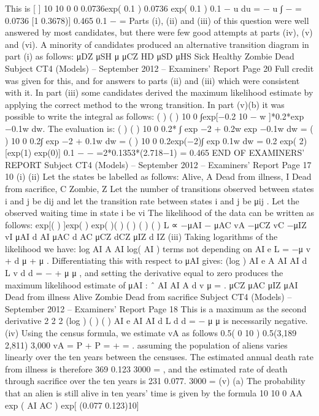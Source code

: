 \documentclass[a4paper,12pt]{article}
\begin{document}
This is
[ ]
10
10
0
0
0.0736exp( 0.1 ) 0.0736 exp( 0.1 )
0.1
− u du = − u
∫ −
= 0.0736 [1 0.3678)] 0.465
0.1
− =
Parts (i), (ii) and (iii) of this question were well answered by most candidates, but there were
few good attempts at parts (iv), (v) and (vi). A minority of candidates produced an
alternative transition diagram in part (i) as follows:
μDZ
μSH
μ μCZ HD μSD
μHS
Sick
Healthy
Zombie
Dead
Subject CT4 (Models) – September 2012 – Examiners’ Report
Page 20
Full credit was given for this, and for answers to parts (ii) and (iii) which were consistent
with it. In part (iii) some candidates derived the maximum likelihood estimate by applying
the correct method to the wrong transition. In part (v)(b) it was possible to write the integral
as follows:
( ) ( )
10
0
∫exp[−0.2 10 − w ]*0.2*exp −0.1w dw.
The evaluation is:
( ) ( )
10
0
0.2* ∫ exp −2 + 0.2w exp −0.1w dw
= ( )
10
0
0.2∫ exp −2 + 0.1w dw
= ( )
10
0
0.2exp(−2)∫ exp 0.1w dw
= 0.2 exp( 2)[exp(1) exp(0)]
0.1
− −
=2*0.1353*(2.718−1) = 0.465
END OF EXAMINERS’ REPORT
Subject CT4 (Models) – September 2012 – Examiners’ Report
Page 17
10
(i)
(ii) Let the states be labelled as follows:
Alive, A
Dead from illness, I
Dead from sacrifice, C
Zombie, Z
Let the number of transitions observed between states i and j be dij
and let the transition rate between states i and j be μij .
Let the observed waiting time in state i be vi
The likelihood of the data can be written as follows:
exp[( ) ]exp( ) exp( )( ) ( ) ( ) ( ) L ∝ −μAI − μAC vA −μCZ vC −μIZ vI μAI d AI μAC d AC μCZ dCZ μIZ d IZ
(iii) Taking logarithms of the likelihood we have:
log AI A AI log( AI ) terms not depending on AI
e L = −μ v + d μ + μ .
Differentiating this with respect to μAI gives:
(log ) AI
e A
AI AI
d L v d
d
= − +
μ μ
,
and setting the derivative equal to zero produces the maximum likelihood estimate of
μAI :
ˆ
AI
AI
A
d
v
μ = .
μCZ
μAC μIZ
μAI
Dead from illness
Alive
Zombie
Dead from sacrifice
Subject CT4 (Models) – September 2012 – Examiners’ Report
Page 18
This is a maximum as the second derivative
2
2 2
(log )
( ) ( )
AI
e
AI AI
d L d
d
= −
μ μ
is necessarily negative.
(iv) Using the census formula, we estimate vA as follows
0.5( 0 10 ) 0.5(3,189 2,811) 3,000 vA = P + P = + = .
assuming the population of aliens varies linearly over the ten years between the
censuses.
The estimated annual death rate from illness is therefore
369 0.123
3000
= ,
and the estimated rate of death through sacrifice over the ten years is
231 0.077.
3000
=
(v) (a) The probability that an alien is still alive in ten years’ time
is given by the formula
10
10
0
AA exp ( AI AC ) exp[ (0.077 0.123)10]
\end{document}
